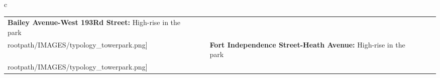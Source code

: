 \begin{table}[H]
        \begin{tabular}{c}
        \begin{tabular}{m{1.25in} m{2in} m{.1in} m{1.25in} m{2in}}
\textbf{Bailey Avenue-West 193Rd Street:} {High-rise in the park} & \texttt{[image: \\rootpath/IMAGES/typology\_towerpark.png]} & & \textbf{Fort Independence Street-Heath Avenue:} {High-rise in the park} & \texttt{[image: \\rootpath/IMAGES/typology\_towerpark.png]}
\end{tabular}\end{tabular}
        \end{table}